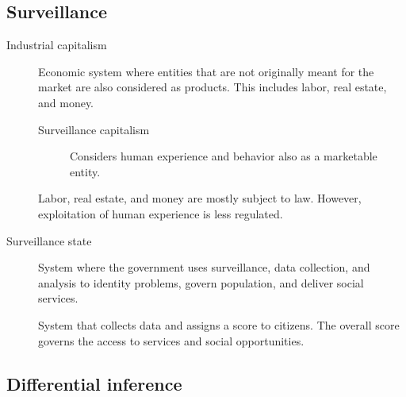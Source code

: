 \subsection{Surveillance}

\begin{description}
    \item[Industrial capitalism] 
        Economic system where entities that are not originally meant for the market are also considered as products. This includes labor, real estate, and money.

        \begin{description}
            \item[Surveillance capitalism] 
                Considers human experience and behavior also as a marketable entity.
        \end{description}

        \begin{remark}
            Labor, real estate, and money are mostly subject to law. However, exploitation of human experience is less regulated.
        \end{remark}

    \item[Surveillance state] 
        System where the government uses surveillance, data collection, and analysis to identity problems, govern population, and deliver social services.

        \begin{example}
            System that collects data and assigns a score to citizens. The overall score governs the access to services and social opportunities.
        \end{example}
\end{description}


\subsection{Differential inference}

